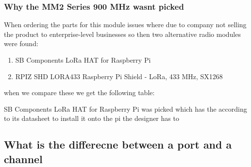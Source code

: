 \subsubsection{Why the MM2 Series 900 MHz wasnt picked}
When ordering the parts for  this module issues where due to company not selling the product to  enterprise-level businesses so then two alternative radio modules were found:
\begin{enumerate}
    \item SB Components LoRa HAT for Raspberry Pi
    \item RPIZ SHD LORA433 Raspberry Pi Shield - LoRa, 433 MHz, SX1268
\end{enumerate}
when we compare these we get the following table:

\begin{table}[h!]
        \caption{Comparing New Radio modules}
        \label{Comparing New Radio modules}
\end{table}
SB Components LoRa HAT for Raspberry Pi   was picked which has the according to its datasheet to install it onto  the pi the designer has to  

\subsection{What is  the differecne  between a  port and a channel}

